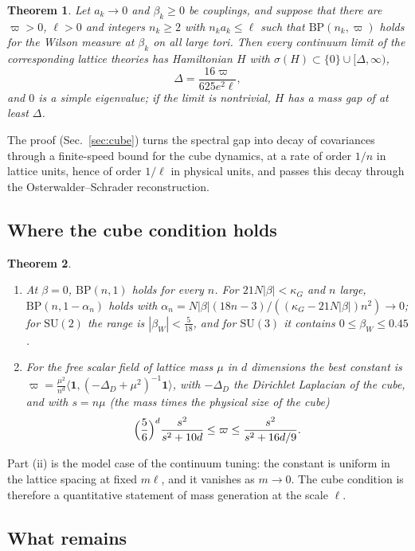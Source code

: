 \documentclass[11pt]{amsart}
\newtheorem{mainthm}{Theorem}
\theoremstyle{definition}
\theoremstyle{remark}
\numberwithin{equation}{section}
\newcommand{\SU}{\mathrm{SU}}
\newcommand{\ip}[2]{\langle #1,#2\rangle}
\newcommand{\BP}{\mathrm{BP}}
\begin{document}
\begin{mainthm}\label{thm:B}
Let $a_k\to0$ and $\beta_k\ge0$ be couplings, and suppose that there are
$\varpi>0$, $\ell>0$ and integers $n_k\ge2$ with $n_ka_k\le\ell$ such that
$\BP(n_k,\varpi)$ holds for the Wilson measure at $\beta_k$ on all large tori.
Then every continuum limit of the corresponding lattice theories has
Hamiltonian $H$ with $\sigma(H)\subset\{0\}\cup[\Delta,\infty)$,
\[
\Delta=\frac{16\varpi}{625e^2\ell},
\]
and $0$ is a simple eigenvalue; if the limit is nontrivial, $H$ has a mass
gap of at least $\Delta$.
\end{mainthm}

The proof (Sec.~\ref{sec:cube}) turns the spectral gap into decay of
covariances through a finite-speed bound for the cube dynamics, at a rate
of order $1/n$ in lattice units, hence of order $1/\ell$ in physical units,
and passes this decay through the Osterwalder--Schrader reconstruction.

\subsection{Where the cube condition holds}

\begin{mainthm}\label{thm:C}
\begin{enumerate}[label=\textup{(\roman*)},leftmargin=*]
\item At $\beta=0$, $\BP(n,1)$ holds for every $n$. For
$21N|\beta|<\kappa_G$ and $n$ large, $\BP(n,1-\alpha_n)$ holds with
$\alpha_n=N|\beta|(18n-3)/((\kappa_G-21N|\beta|)n^2)\to0$; for $\SU(2)$ the
range is $|\beta_W|<\frac5{18}$, and for $\SU(3)$ it contains
$0\le\beta_W\le0.45$.
\item For the free scalar field of lattice mass $\mu$ in $d$ dimensions the
best constant is
$\varpi=\frac{\mu^2}{n^d}\ip{\mathbf 1}{(-\Delta_D+\mu^2)^{-1}\mathbf 1}$, with
$-\Delta_D$ the Dirichlet Laplacian of the cube, and with $s=n\mu$ (the mass
times the physical size of the cube)
\[
\Bigl(\frac56\Bigr)^d\frac{s^2}{s^2+10d}\le\varpi\le\frac{s^2}{s^2+16d/9}.
\]
\end{enumerate}
\end{mainthm}

Part (ii) is the model case of the continuum tuning: the constant is uniform
in the lattice spacing at fixed $m\ell$, and it vanishes as $m\to0$. The cube
condition is therefore a quantitative statement of mass generation at the
scale $\ell$.

\subsection{What remains}
\end{document}
